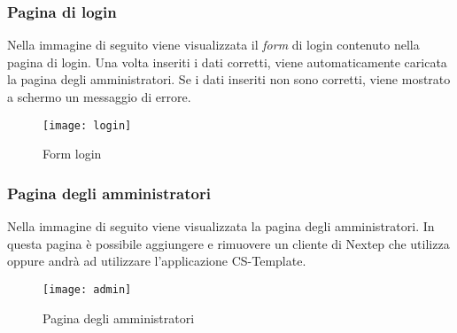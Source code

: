 \subsubsection{Pagina di login}
Nella immagine di seguito viene visualizzata il \emph{form} di login contenuto nella pagina di login. Una volta inseriti i dati corretti, viene automaticamente caricata la pagina degli amministratori. Se i dati inseriti non sono corretti, viene mostrato a schermo un messaggio di errore.
\begin{figure}[!h] 
	\centering 
	\texttt{[image: login]} 
	\caption{Form login }
\end{figure}
\subsubsection{Pagina degli amministratori}
Nella immagine di seguito viene visualizzata la pagina degli amministratori. In questa pagina è possibile aggiungere e rimuovere un cliente di Nextep che utilizza oppure andrà ad utilizzare l'applicazione CS-Template.
\begin{figure}[!h] 
	\centering 
	\texttt{[image: admin]} 
	\caption{Pagina degli amministratori }
\end{figure}

